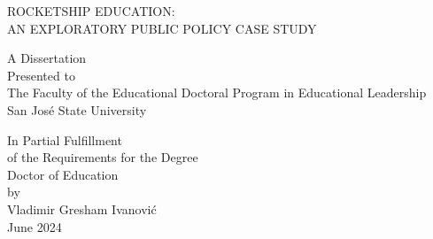 
\begin{vplace}%
\begin{center}

  ROCKETSHIP EDUCATION:\\\vspace{1ex}
  AN EXPLORATORY PUBLIC POLICY CASE STUDY\\
\vspace{2\baselineskip}

A Dissertation\\
Presented to\\
The Faculty of the Educational Doctoral Program in Educational Leadership\\
San José State University\\
\vspace{2\baselineskip}

In Partial Fulfillment\\
of the Requirements for the Degree\\
Doctor of Education\\
\vspace{2\baselineskip}
by\\
Vladimir Gresham Ivanović\\
June 2024\\


\end{center}
\end{vplace}

\thispagestyle{empty}

